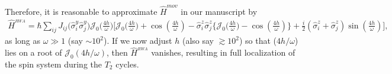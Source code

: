 \documentclass[aps,prb,reprint,showpacs,floatfix,superscriptaddress, onecolumn, nofootinbib, 9pt]{revtex4-2}
\begin{document}
\begin{enumerate}
{    Therefore, it is reasonable to approximate   $\hat{H}^{mov}$ in our manuscript by 
    \begin{align}
		\hat{H}^{_{RWA}} = \hbar\sum_{ij} J_{ij} \Big(\hat{\sigma}^y_i\hat{\sigma}^y_j\Big) \mathcal{J}_0\Big(\frac{4h}{\omega}\Big)\Bigg[\mathcal{J}_0\Big(\frac{4h}{\omega}\Big) + \cos(\frac{4h}{\omega}) -\hat{\sigma}^z_i\hat{\sigma}^z_j \Bigg\{\mathcal{J}_0\Big(\frac{4h}{\omega}\Big) - \cos(\frac{4h}{\omega})\Bigg\} + \frac{i}{2} (\hat{\sigma}^z_i + \hat{\sigma}^z_j) \sin(\frac{4h}{\omega})\Bigg],
	\end{align}
    as long as $\omega\gg 1$ (say $\sim 10^2$). If we now adjust $h$ (also say $\gtrsim 10^2$) so that ($4h/\omega$) lies on a root of $\mathcal{J}_0(4h/\omega)$, then $\hat{H}^{_{RWA}}$ vanishes, resulting in full localization of the spin system during the $T_2$ cycles.

}
\end{enumerate}
\end{document}

